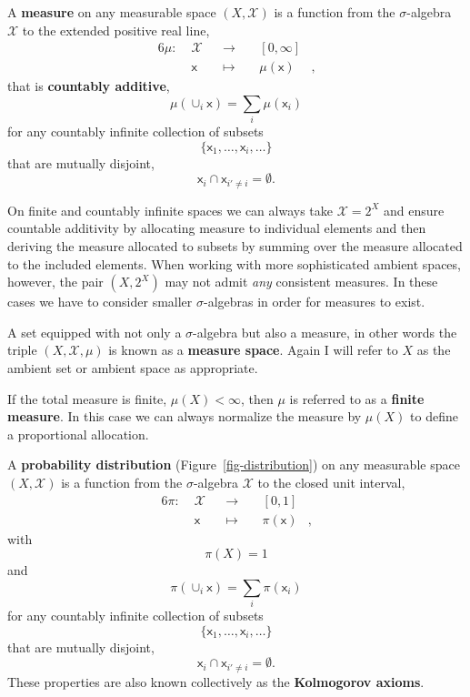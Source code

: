 \documentclass[
  letterpaper,
  DIV=11,
  numbers=noendperiod]{scrartcl}
\begin{document}
A \textbf{measure} on any measurable space \((X, \mathcal{X})\) is a
function from the \(\sigma\)-algebra \(\mathcal{X}\) to the extended
positive real line, \begin{alignat*}{6}
\mu :\; & \mathcal{X} & &\rightarrow& \; & [0, \infty] &
\\
& \mathsf{x} & &\mapsto& & \mu(\mathsf{x}) &,
\end{alignat*} that is \textbf{countably additive}, \[
\mu( \cup_{i} \mathsf{x} ) = \sum_{i} \mu( \mathsf{x}_{i} )
\] for any countably infinite collection of subsets \[
\{ \mathsf{x}_{1}, \ldots, \mathsf{x}_{i}, \ldots \}
\] that are mutually disjoint, \[
\mathsf{x}_{i} \cap \mathsf{x}_{i' \ne i} = \emptyset.
\]

On finite and countably infinite spaces we can always take
\(\mathcal{X} = 2^{X}\) and ensure countable additivity by allocating
measure to individual elements and then deriving the measure allocated
to subsets by summing over the measure allocated to the included
elements. When working with more sophisticated ambient spaces, however,
the pair \((X, 2^{X})\) may not admit \emph{any} consistent measures. In
these cases we have to consider smaller \(\sigma\)-algebras in order for
measures to exist.

A set equipped with not only a \(\sigma\)-algebra but also a measure, in
other words the triple \((X, \mathcal{X}, \mu)\) is known as a
\textbf{measure space}. Again I will refer to \(X\) as the ambient set
or ambient space as appropriate.

If the total measure is finite, \(\mu(X) < \infty\), then \(\mu\) is
referred to as a \textbf{finite measure}. In this case we can always
normalize the measure by \(\mu(X)\) to define a proportional allocation.

A \textbf{probability distribution} (Figure~\ref{fig-distribution}) on
any measurable space \((X, \mathcal{X})\) is a function from the
\(\sigma\)-algebra \(\mathcal{X}\) to the closed unit interval,
\begin{alignat*}{6}
\pi :\; & \mathcal{X} & &\rightarrow& \; & [0, 1] &
\\
& \mathsf{x} & &\mapsto& & \pi(\mathsf{x}) &,
\end{alignat*} with \[
\pi(X) = 1
\] and \[
\pi( \cup_{i} \mathsf{x} ) = \sum_{i} \pi( \mathsf{x}_{i} )
\] for any countably infinite collection of subsets \[
\{ \mathsf{x}_{1}, \ldots, \mathsf{x}_{i}, \ldots \}
\] that are mutually disjoint, \[
\mathsf{x}_{i} \cap \mathsf{x}_{i' \ne i} = \emptyset.
\] These properties are also known collectively as the
\textbf{Kolmogorov axioms}.
\end{document}
